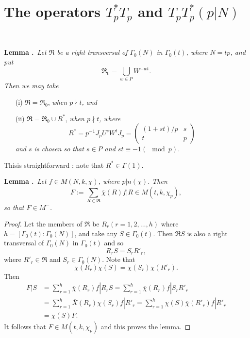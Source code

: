 \section{The operators \texorpdfstring{$T^{*}_{p}T_{p}$}{TpTp} and \texorpdfstring{$T_{p}T^{*}_{p}(p|N)$}{TpTppN}}\label{art10-sec8}
~

\medskip
\noindent
{\bf Lemma .\label{art10-lem8.1}}~{\em Let $\mathfrak{R}$ be a right transversal of $\Gamma_{0}(N)$ in $\Gamma_{0}(t)$, where $N=tp$, and put}
\setcounter{equation}{0}
\begin{equation}
\mathfrak{R}_{0}=\bigcup\limits_{w\in P}W^{-wt}.
\end{equation}
{\em Then we may take}
\begin{itemize}
\item[(i)] $\mathfrak{R}=\mathfrak{R}_{0}$, {\em when $p\nmid t$, and}

\item[(ii)] $\mathfrak{R}=\mathfrak{R}_{0}\cup R^{*}$, {\em when $p\nmid t$, where}
\begin{equation}
R^{*}=p^{-1}J_{p}U^{s}W^{t}J_{p}=
\left(
\begin{matrix}
(1+st)/p & s\\
t & p
\end{matrix}
\right)\label{art10-eq8.2}
\end{equation}
{\em and $s$ is chosen so that $s\in P$ and $st\equiv -1(\mod p)$.}
\end{itemize}

This\pageoriginale is straightforward : note that $R^{*}\in \Gamma(1)$.

\medskip
\noindent
{\bf Lemma .\label{art10-lem8.2}}~{\em Let $f\in M(N,k,\chi)$, where $p|n(\chi)$. Then}
$$
F:=\sum\limits_{R\in \mathfrak{R}}\overline{\chi}(R)f|R\in M(t,k,\chi_{p}),
$$
{\em so that $F\in M^{-}$.}

\begin{proof}
Let the members of $\mathfrak{R}$ be $R_{r}(r=1,2,\ldots,h)$ where $h=[\Gamma_{0}(t):\Gamma_{0}(N)]$, and take any $S\in \Gamma_{0}(t)$. Then $\mathfrak{R}S$ is also a right transversal of $\Gamma_{0}(N)$ in $\Gamma_{0}(t)$ and so
$$
R_{r}S=S_{r}R'_{r},
$$
where $R'_{r}\in \mathfrak{R}$ and $S_{r}\in \Gamma_{0}(N)$. Note that
$$
\chi(R_{r})\chi(S)=\chi(S_{r})\chi(R'_{r}).
$$
Then
\begin{align*}
F|S &= \sum\limits^{h}_{r=1}\overline{\chi}(R_{r})f|R_{r}S=\sum\limits^{h}_{r=1}\overline{\chi}(R_{r})f|S_{r}R'_{r}\\[3pt]
&= \sum\limits^{h}_{r=1}\overline{X}(R_{r})\chi(S_{r})f|R'_{r}=\sum\limits^{h}_{r=1}\chi(S)\overline{\chi}(R'_{r})f|R'_{r}\\[3pt]
&= \chi(S)F.
\end{align*}
It follows that $F\in M(t,k,\chi_{p})$ and this proves the lemma.
\end{proof}

